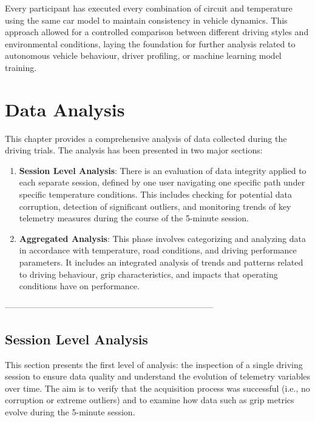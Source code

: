 \documentclass[a4paper,final,12pt]{report}
\begin{document}
Every participant has executed every combination of circuit and temperature  using the same car model to maintain consistency in vehicle dynamics. This approach allowed for a controlled comparison between different driving styles and environmental conditions, laying the foundation for further analysis related to autonomous vehicle behaviour, driver profiling, or machine learning model training.

\section{Data Analysis}
This chapter provides a comprehensive analysis of data collected during the driving trials. The analysis has been presented in two major sections:

\begin{enumerate}
    \item \textbf{Session Level Analysis}: There is an evaluation of data integrity applied to each separate session, defined by one user navigating one specific path under specific temperature conditions. This includes checking for potential data corruption, detection of significant outliers, and monitoring trends of key telemetry measures during the course of the 5-minute session.
    \item \textbf{Aggregated Analysis}: This phase involves categorizing and analyzing data in accordance with temperature, road conditions, and driving performance parameters. It includes an integrated analysis of trends and patterns related to driving behaviour, grip characteristics, and impacts that operating conditions have on performance.
\end{enumerate}
--------------------------------------------------------------------------

\newpage











\subsection{Session Level Analysis}
This section presents the first level of analysis: the inspection of a single driving session to ensure data quality and understand the evolution of telemetry variables over time. The aim is to verify that the acquisition process was successful (i.e., no corruption or extreme outliers) and to examine how data such as grip metrics evolve during the 5-minute session.\\
\end{document}
